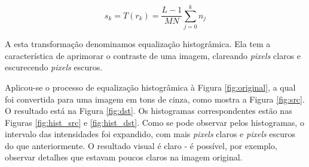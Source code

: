 \documentclass[10pt,a4paper]{article}
\newcommand{\pixels}{\textit{pixels} }
\begin{document}
\begin{equation}
    s_k = T(r_k) = \frac{L-1}{MN}\sum_{j=0}^k n_j
    \label{eq:hist_eq}
\end{equation}

A esta transformação denominamos equalização histogrâmica. Ela tem a característica de aprimorar o contraste de uma imagem, clareando \pixels claros e escurecendo \pixels escuros.

Aplicou-se o processo de equalização histogrâmica à Figura \ref{fig:original}, a qual foi convertida para uma imagem em tons de cinza, como mostra a Figura \ref{fig:src}. O resultado está na Figura \ref{fig:dst}. Os histogramas correspondentes estão nas Figuras \ref{fig:hist_src} e \ref{fig:hist_dst}. Como se pode observar pelos histogramas, o intervalo das intensidades foi expandido, com mais \pixels claros e \pixels escuros do que anteriormente. O resultado visual é claro - é possível, por exemplo, observar detalhes que estavam poucos claros na imagem original.
\end{document}
